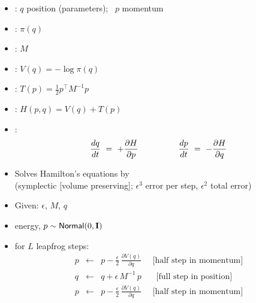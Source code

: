 \documentclass[10pt]{report}
\begin{document}
%
\begin{itemize}
\item {}: $q$ position (parameters); \ $p$ momentum
\item {}: $\pi(q)$
\item {}: $M$
\item {}: $V(q) = -\log \pi(q)$
\item {}: $T(p) = \frac{1}{2} p^{\top} M^{-1} p$
\item {}:  $H(p,q) = V(q) + T(p)$
\item {}:
  \[
  \frac{dq}{dt} \ = \  + \frac{\partial H}{\partial p}
  \hspace*{48pt}
  \frac{dp}{dt} \ = \ - \frac{\partial H}{\partial q}
  \]
\end{itemize}


%
\begin{itemize}
\item Solves Hamilton's equations by 
  \\
  {\footnotesize (symplectic [volume preserving]; $\epsilon^3$ error per step, $\epsilon^2$ total error)}
\item Given:  $\epsilon$,  $M$,  $q$
\item {} energy, $p \sim {\sf
    Normal}(0,\mbox{\bf I})$
\item {} for $L$ leapfrog steps:
  \begin{eqnarray*}
    p & \leftarrow &
    p - \frac{\epsilon}{2} \, \frac{\partial V(q)}{\partial q}
    \ \ \ \ \ \ \mbox{[half step in momentum]}
    \\[6pt]
    q & \leftarrow &
    q + \epsilon \, M^{-1} \, p
    \ \ \ \ \ \ \ \  \mbox{[full step in position]}
    \\[6pt]
    p & \leftarrow &
    p - \frac{\epsilon}{2} \, \frac{\partial V(q)}{\partial q}
    \ \ \ \ \ \ \mbox{[half step in momentum]}
  \end{eqnarray*}
\end{itemize}
\end{document}
